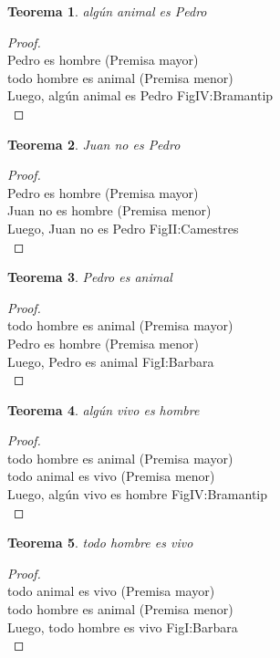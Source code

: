 ﻿\documentclass[12pt]{book}
\newtheorem{theorem}{Teorema}[chapter]
\newtheorem{proof}{Demostración}
\begin{document}
\begin{theorem}
algún animal es Pedro
\label{th: 12}
\end{theorem}\begin{proof}\\Pedro es hombre	 (Premisa mayor) \\todo hombre es animal	 (Premisa menor) \\Luego, algún animal es Pedro	FigIV:Bramantip \\ \end{proof}
\begin{theorem}
Juan no es Pedro
\label{th: 13}
\end{theorem}\begin{proof}\\Pedro es hombre	 (Premisa mayor) \\Juan no es hombre	 (Premisa menor) \\Luego, Juan no es Pedro	FigII:Camestres \\ \end{proof}
\begin{theorem}
Pedro es animal
\label{th: 14}
\end{theorem}\begin{proof}\\todo hombre es animal	 (Premisa mayor) \\Pedro es hombre	 (Premisa menor) \\Luego, Pedro es animal	FigI:Barbara \\ \end{proof}
\begin{theorem}
algún vivo es hombre
\label{th: 15}
\end{theorem}\begin{proof}\\todo hombre es animal	 (Premisa mayor) \\todo animal es vivo	 (Premisa menor) \\Luego, algún vivo es hombre	FigIV:Bramantip \\ \end{proof}
\begin{theorem}
todo hombre es vivo
\label{th: 16}
\end{theorem}\begin{proof}\\todo animal es vivo	 (Premisa mayor) \\todo hombre es animal	 (Premisa menor) \\Luego, todo hombre es vivo	FigI:Barbara \\ \end{proof}
\end{document}
